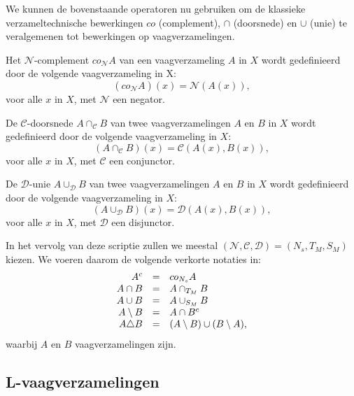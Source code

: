 We kunnen de bovenstaande operatoren nu gebruiken om de klassieke verzameltechnische bewerkingen 
$co$ (complement), $\cap$ (doorsnede) en $\cup$ (unie) te
veralgemenen tot bewerkingen op vaagverzamelingen.
\begin{definitie}
Het $\mathcal{N}$-complement $co_\mathcal{N} A$ van een vaagverzameling $A$ in $X$ wordt gedefinieerd
door de volgende vaagverzameling in X:
$$
(co_\mathcal{N} A)(x) = \mathcal{N}(A(x)),
$$
voor alle $x$ in $X$, met $\mathcal{N}$ een negator.
\end{definitie}
\begin{definitie}
De $\mathcal{C}$-doorsnede $A \cap_\mathcal{C} B$ van twee vaagverzamelingen $A$ en $B$ in $X$
wordt gedefinieerd door de volgende vaagverzameling in $X$:
$$
(A \cap_\mathcal{C} B)(x) = \mathcal{C}(A(x),B(x)),
$$
voor alle $x$ in $X$, met $\mathcal{C}$ een conjunctor.
\end{definitie}
\begin{definitie}
De $\mathcal{D}$-unie $A \cup_\mathcal{D} B$ van twee vaagverzamelingen $A$ en $B$ in $X$ wordt gedefinieerd door de
volgende vaagverzameling in $X$:
$$
(A \cup_\mathcal{D} B)(x) = \mathcal{D}(A(x),B(x)),
$$
voor alle $x$ in $X$, met $\mathcal{D}$ een disjunctor.
\end{definitie}

In het vervolg van deze scriptie zullen we meestal 
$(\mathcal{N},\mathcal{C},\mathcal{D})=(N_s,T_M,S_M)$ kiezen. We voeren daarom de volgende
verkorte notaties in:
$$
\begin{array}{r@{\quad=\quad}l}
A^c 			& co_{N_s} A \\
A \cap B 		& A \cap_{T_M} B \\
A \cup B		& A \cup_{S_M} B \\
A \setminus B  	& A \cap B^c \\
A \triangle B 	& (A \setminus B) \cup (B \setminus A),
\end{array}
$$
waarbij $A$ en $B$ vaagverzamelingen zijn.


\subsection{L-vaagverzamelingen}

